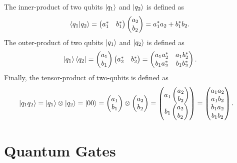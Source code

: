\documentclass[Dual]{msu-thesis}
\begin{document}
The inner-product of two qubits $\ket{q_1}$ and $\ket{q_2}$ is defined as
\begin{align}
\bra{q_1}\ket{q_2}
=
\begin{pmatrix} 
a^*_1 & b^*_1
\end{pmatrix}
\begin{pmatrix}
a_2 \\ b_2
\end{pmatrix}
=
a^*_1a_2+b^*_1b_2
.\end{align}
The outer-product of two qubits $\ket{q_1}$ and $\ket{q_2}$ is defined as
\begin{align}
\ket{q_1}\bra{q_2}
=
\begin{pmatrix} 
a_1 \\ b_1
\end{pmatrix}
\begin{pmatrix}
a^*_2 & b^*_2
\end{pmatrix}
=
\begin{pmatrix}
a_1a^*_2 & a_1b^*_2
\\
b_1a^*_2 & b_1b^*_2
\end{pmatrix}
.\end{align}
Finally, the tensor-product of two-qubits is defined as
\begin{align}
\ket{q_1q_2}
=
\ket{q_1}\otimes\ket{q_2}
=
\ket{00}&=\begin{pmatrix}
a_1 \\ b_1
\end{pmatrix}
\otimes
\begin{pmatrix}
a_2 \\ b_2
\end{pmatrix}
=\begin{pmatrix}
a_1\begin{pmatrix}
a_2 \\ b_2
\end{pmatrix}
\\
b_1\begin{pmatrix}
a_2 \\ b_2
\end{pmatrix}
\end{pmatrix}
=\begin{pmatrix}
a_1a_2 \\ a_1b_2 \\ b_1a_2 \\ b_1b_2
\end{pmatrix}
.\end{align}

\section{Quantum Gates}
\end{document}
